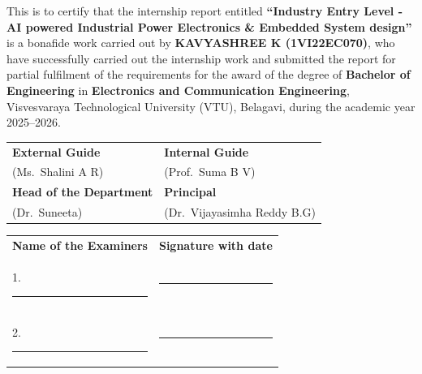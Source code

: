\documentclass[12pt,a4paper,twocolumn,fleqn]{article}
\begin{document}
\noindent
This is to certify that the internship report entitled \textbf{“Industry Entry Level - AI powered Industrial
Power Electronics \& Embedded System design”} is a bonafide work carried out by  
\textbf{KAVYASHREE K (1VI22EC070)},
who have successfully carried out the internship work and submitted the report for partial fulfilment of the requirements for the award of the degree of 
\textbf{Bachelor of Engineering} in  
\textbf{Electronics and Communication Engineering},  
Visvesvaraya Technological University (VTU), Belagavi, during the academic year 2025–2026. \\[0.1cm] 
\newline
\begin{center}
\renewcommand{\arraystretch}{1.5} %

\begin{tabular}{p{7cm} p{7cm}}

\hspace{1.8cm}\textbf{External Guide} & \hspace{1.8cm}\textbf{Internal Guide} \\
\hspace{1.8cm}(Ms.\ Shalini A R) & \hspace{1.8cm}(Prof.\ Suma B V) \\[1cm]

\hspace{1.3cm}\textbf{Head of the Department} & \hspace{2.2cm}\textbf{Principal} \\
\hspace{2.6cm}(Dr.\ Suneeta) & \hspace{0.8cm}(Dr.\ Vijayasimha Reddy B.G) \\


\end{tabular}
\end{center}
\begin{tabular}{p{8.7cm} p{7cm}}\\[7mm]
\textbf{Name of the Examiners} & \hspace{0.5cm}\textbf{Signature with date}
\\[6mm]

\hspace{-0.7cm}1.\rule{5cm}{0.4pt} & \rule{5cm}{0.4pt} \\[10mm]

\hspace{-0.7cm}2.\rule{5cm}{0.4pt} & \rule{5cm}{0.4pt} \\[6mm]

\end{tabular}
\end{document}
